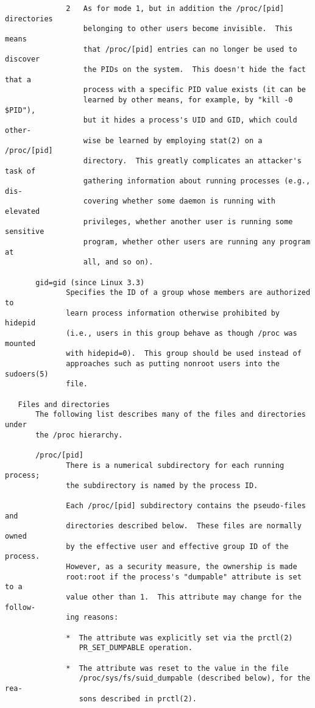 \documentclass[]{article}
\begin{document}
\begin{verbatim}
              2   As for mode 1, but in addition the /proc/[pid] directories
                  belonging to other users become invisible.  This means
                  that /proc/[pid] entries can no longer be used to discover
                  the PIDs on the system.  This doesn't hide the fact that a
                  process with a specific PID value exists (it can be
                  learned by other means, for example, by "kill -0 $PID"),
                  but it hides a process's UID and GID, which could other‐
                  wise be learned by employing stat(2) on a /proc/[pid]
                  directory.  This greatly complicates an attacker's task of
                  gathering information about running processes (e.g., dis‐
                  covering whether some daemon is running with elevated
                  privileges, whether another user is running some sensitive
                  program, whether other users are running any program at
                  all, and so on).

       gid=gid (since Linux 3.3)
              Specifies the ID of a group whose members are authorized to
              learn process information otherwise prohibited by hidepid
              (i.e., users in this group behave as though /proc was mounted
              with hidepid=0).  This group should be used instead of
              approaches such as putting nonroot users into the sudoers(5)
              file.

   Files and directories
       The following list describes many of the files and directories under
       the /proc hierarchy.

       /proc/[pid]
              There is a numerical subdirectory for each running process;
              the subdirectory is named by the process ID.

              Each /proc/[pid] subdirectory contains the pseudo-files and
              directories described below.  These files are normally owned
              by the effective user and effective group ID of the process.
              However, as a security measure, the ownership is made
              root:root if the process's "dumpable" attribute is set to a
              value other than 1.  This attribute may change for the follow‐
              ing reasons:

              *  The attribute was explicitly set via the prctl(2)
                 PR_SET_DUMPABLE operation.

              *  The attribute was reset to the value in the file
                 /proc/sys/fs/suid_dumpable (described below), for the rea‐
                 sons described in prctl(2).


\end{verbatim}
\end{document}
